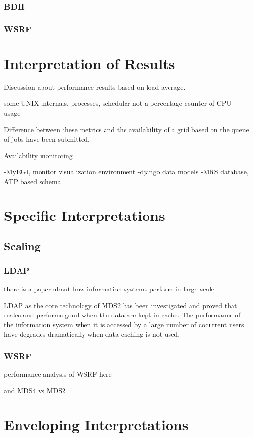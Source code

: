 \subsubsection{BDII}

\subsubsection{WSRF}


\section{Interpretation of Results}


Discussion about performance results based on
load average.

some UNIX internals, processes, scheduler
not a percentage counter of CPU usage


Difference between these metrics and the availability of 
a grid based on the queue of jobs have been submitted.

Availability monitoring

-MyEGI, monitor visualization environment
-django data models
-MRS database, ATP based schema


\section{Specific Interpretations}

\subsection{Scaling}
\subsubsection{LDAP}

there is a paper about how information systems perform in large scale

LDAP as the core technology of MDS2 has been investigated \cite{zhang2004performance} and proved that scales and performs good when the data are kept in cache. The performance of the information system when it is accessed by a large number of cocurrent users have degrades dramatically when data caching is not used.

\subsubsection{WSRF}

performance analysis of WSRF here \cite{schopf2006monitoring}

and MDS4 vs MDS2

\section{Enveloping Interpretations}
